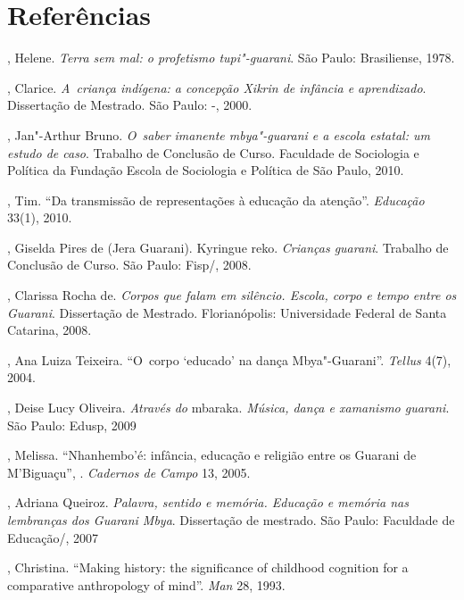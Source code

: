 \section{Referências}

\begin{Parskip}
, Helene. \emph{Terra sem mal: o profetismo tupi"-guarani}. São
Paulo: Brasiliense, 1978.

, Clarice. \emph{A~criança indígena: a concepção Xikrin de infância
e aprendizado}. Dissertação de Mestrado. São Paulo: -, 2000.

, Jan"-Arthur Bruno. \emph{O~saber imanente mbya"-guarani e a escola
estatal: um estudo de caso}. Trabalho de Conclusão de Curso. Faculdade
de Sociologia e Política da Fundação Escola de Sociologia e Política de
São Paulo, 2010.

, Tim. ``Da transmissão de representações à educação da
atenção''. \emph{Educação} 33(1), 2010.

, Giselda Pires de (Jera Guarani). Kyringue reko. \emph{Crianças
guarani}. Trabalho de Conclusão de Curso. São Paulo: Fisp/, 2008.

, Clarissa Rocha de. \emph{Corpos que falam em silêncio. Escola,
corpo e tempo entre os Guarani}. Dissertação de Mestrado.
Florianópolis: Universidade Federal de Santa Catarina, 2008.

, Ana Luiza Teixeira. ``O~corpo `educado' na dança
Mbya"-Guarani''. \emph{Tellus} 4(7), 2004.

, Deise Lucy Oliveira. \emph{Através do} mbaraka. \emph{Música, dança e
xamanismo guarani}. São Paulo: Edusp, 2009

, Melissa. ``Nhanhembo’é: infância, educação e religião
entre os Guarani de M’Biguaçu'', . \emph{Cadernos de Campo} 13, 2005.

, Adriana Queiroz. \emph{Palavra, sentido e memória. Educação e
memória nas lembranças dos Guarani Mbya}. Dissertação de mestrado. São
Paulo: Faculdade de Educação/, 2007

, Christina. ``Making history: the significance of childhood
cognition for a comparative anthropology of mind''. \emph{Man} 28, 1993.
\end{Parskip}

\clearpage

\vspace*{\fill}

